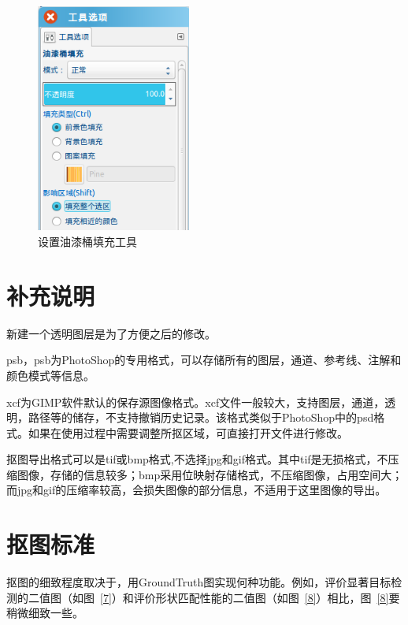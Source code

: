 \documentclass[12pt]{article}
\begin{document}
\begin{figure}[htbp]
\centering
\includegraphics[width=2in]{tianchong1.png}
\caption{设置油漆桶填充工具}
\label{5}
\end{figure}



\section{补充说明}

\begin{itemize*}
\item 新建一个透明图层是为了方便之后的修改。

\item psb，psb为PhotoShop的专用格式，可以存储所有的图层，通道、参考线、注解和颜色模式等信息。

\item xcf为GIMP软件默认的保存源图像格式。xcf文件一般较大，支持图层，通道，透明，路径等的储存，不支持撤销历史记录。该格式类似于PhotoShop中的psd格式。如果在使用过程中需要调整所抠区域，可直接打开文件进行修改。

\item 抠图导出格式可以是tif或bmp格式,不选择jpg和gif格式。其中tif是无损格式，不压缩图像，存储的信息较多；bmp采用位映射存储格式，不压缩图像，占用空间大；而jpg和gif的压缩率较高，会损失图像的部分信息，不适用于这里图像的导出。
\end{itemize*}

\section{抠图标准}
\hspace{0.3in}抠图的细致程度取决于，用GroundTruth图实现何种功能。例如，评价显著目标检测的二值图（如图~\ref{7}）和评价形状匹配性能的二值图（如图~\ref{8}）相比，图~\ref{8}要稍微细致一些。\\
\end{document}
